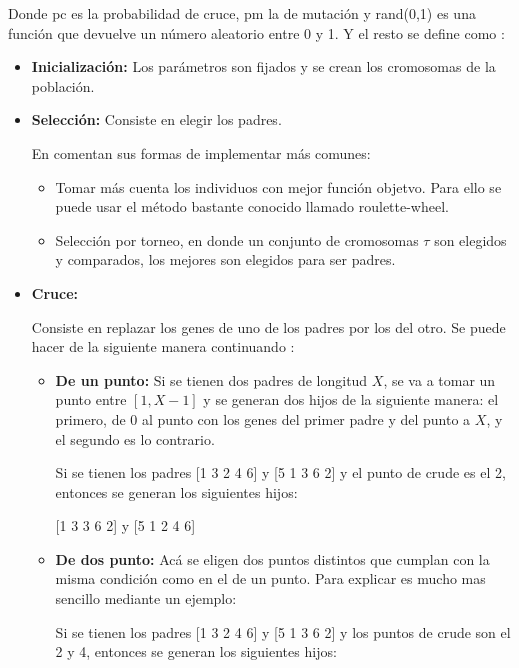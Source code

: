 Donde pc es la probabilidad de cruce, pm la de mutaci\'on y rand(0,1)
es una funci\'on que devuelve un n\'umero aleatorio entre 0 y 1. Y el resto
se define como :

\begin{itemize}

\item {\bf Inicializaci\'on:} Los par\'ametros son fijados y se
crean los cromosomas de la poblaci\'on.

\item {\bf Selecci\'on:} Consiste en elegir los padres. 

En \cite{GePo2010} comentan sus formas de implementar m\'as comunes:

\begin{itemize}

\item Tomar m\'as cuenta los individuos
con mejor funci\'on objetvo. Para ello se puede usar el m\'etodo bastante conocido
llamado roulette-wheel. 

\item Selecci\'on por torneo, en
donde un conjunto de cromosomas $\tau$ son elegidos y comparados, los mejores
son elegidos para ser padres. 

\end{itemize}

\item {\bf Cruce:}

Consiste en replazar los genes de uno de los padres por los del otro. Se puede hacer
de la siguiente manera continuando \cite{GePo2010}:

\begin{itemize}

\item {\bf De un punto:} Si se tienen dos padres de longitud $X$, se va a tomar
un punto entre $[1,X-1]$ y se generan dos hijos de la siguiente manera: el primero,
de 0 al punto con los genes del primer padre y del punto a $X$, y el segundo es 
lo contrario.

Si se tienen los padres [1 3 2 4 6]  y [5 1 3 6 2] y el punto 
de crude es el 2, entonces se generan los siguientes hijos:

[1 3 3 6 2] y [5 1 2 4 6]

\item {\bf De dos punto:} Ac\'a se eligen dos puntos distintos que cumplan con la 
misma condici\'on como en el de un punto. Para explicar es mucho mas sencillo
mediante un ejemplo:

Si se tienen los padres [1 3 2 4 6]  y [5 1 3 6 2] y los puntos 
de crude son el 2 y 4, entonces se generan los siguientes hijos:


\end{itemize}
\end{itemize}
